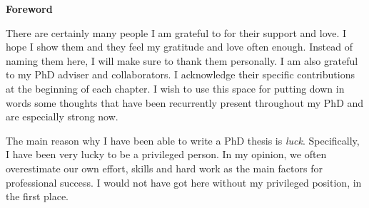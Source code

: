 {}
\begingroup
\vspace*{\fill}
	\begin{center} 
        \Large{\textbf{Foreword}}
	\vspace{10pt}
	\end{center}
\small
There are certainly many people I am grateful to for their support and love. I hope I show them and they feel my gratitude and love often enough. Instead of naming them here, I will make sure to thank them personally. I am also grateful to my PhD adviser and collaborators. I acknowledge their specific contributions at the beginning of each chapter. I wish to use this space for putting down in words some thoughts that have been recurrently present throughout my PhD and are especially strong now. 

The main reason why I have been able to write a PhD thesis is \textit{luck}. Specifically, I have been very lucky to be a privileged person. In my opinion, we often overestimate our own effort, skills and hard work as the main factors for professional success. I would not have got here without my privileged position, in the first place. 


